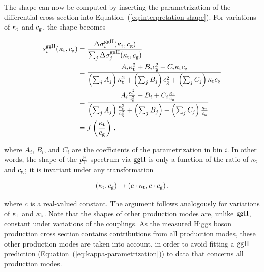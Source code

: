The shape can now be computed by inserting the parametrization of the differential cross section into Equation~(\ref{eq:interpretation-shape}).
% 
For variations of $\kappa_{\mathrm{t}}$ and $c_\mathrm{g}$, the shape becomes
% 
\begin{linenomath*}
\begin{equation}
\label{eq:interpretation-shape-ktcg}
\begin{split}
s^{\mathrm{g}\mathrm{g}\mathrm{H}}_i(\kappa_{\mathrm{t}}, c_\mathrm{g})
        &=
        \frac
            {\Delta\sigma^{\mathrm{g}\mathrm{g}\mathrm{H}}_i(\kappa_{\mathrm{t}}, c_\mathrm{g})}
            {\sum_j \Delta\sigma^{\mathrm{g}\mathrm{g}\mathrm{H}}_j(\kappa_{\mathrm{t}}, c_\mathrm{g})}
            \\
        &=
        \frac
            {A_i \kappa_{\mathrm{t}}^2 + B_i c_\mathrm{g}^2 + C_i \kappa_{\mathrm{t}} c_\mathrm{g}}
            {
                \left(\sum_j A_j\right) \kappa_{\mathrm{t}}^2
                + \left(\sum_j B_j\right) c_\mathrm{g}^2
                + \left(\sum_j C_j\right) \kappa_{\mathrm{t}}c_\mathrm{g}
                }
            \\
        &= 
        \frac
            {A_i \frac{\kappa_{\mathrm{t}}^2}{c_\mathrm{g}^2} + B_i + C_i \frac{\kappa_{\mathrm{t}}}{c_\mathrm{g}}}
            {
                \left(\sum_j A_j\right) \frac{\kappa_{\mathrm{t}}^2}{c_\mathrm{g}^2}
                + \left(\sum_j B_j\right) 
                + \left(\sum_j C_j\right) \frac{\kappa_{\mathrm{t}}}{c_\mathrm{g}}
                }
            \\
        & = f \left( \frac{\kappa_{\mathrm{t}}}{c_\mathrm{g}} \right)
\,,
\end{split}
\end{equation}
\end{linenomath*}
% 
where $A_i$, $B_i$, and $C_i$ are the coefficients of the parametrization in bin $i$.
% 
In other words, the shape of the $p_\mathrm{T}^\mathrm{H}$ spectrum via $\mathrm{g}\mathrm{g}\mathrm{H}$ is only a function of the ratio of $\kappa_{\mathrm{t}}$ and $c_\mathrm{g}$; it is invariant under any transformation
% 
\begin{linenomath*}
\begin{equation}
\label{eq:interpretation-ktcg-transform}
(\kappa_{\mathrm{t}}, c_\mathrm{g}) \to (c \cdot \kappa_{\mathrm{t}}, c \cdot c_\mathrm{g})
\,,
\end{equation}
\end{linenomath*}
% 
where $c$ is a real-valued constant.
% 
The argument follows analogously for variations of $\kappa_{\mathrm{t}}$ and $\kappa_{\mathrm{b}}$.
% 
Note that the shapes of other production modes are, unlike $\mathrm{g}\mathrm{g}\mathrm{H}$, constant under variations of the couplings.
% 
As the measured Higgs boson production cross section contains contributions from all production modes, these other production modes are taken into account, in order to avoid fitting a $\mathrm{g}\mathrm{g}\mathrm{H}$ prediction (Equation~(\ref{eq:kappa-parametrization})) to data that concerns all production modes.



